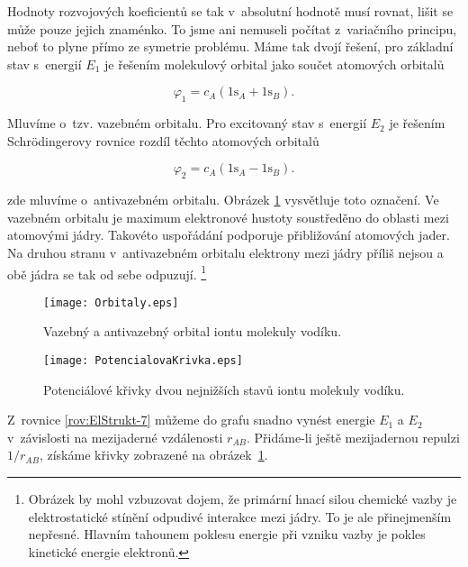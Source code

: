 \noindent Hodnoty rozvojových koeficientů se tak v~absolutní hodnotě musí rovnat, lišit se může pouze jejich znaménko. To jsme ani nemuseli počítat z~variačního principu, neboť to plyne přímo ze symetrie problému. Máme tak dvojí řešení, pro základní stav s~energií $E_1$ je řešením molekulový orbital jako součet atomových orbitalů

\begin{equation}
\varphi_1 = c_A (1\mathrm{s}_A + 1\mathrm{s}_B).
\label{rov:ElStrukt-12}
\end{equation}

\noindent Mluvíme o~tzv. vazebném orbitalu. Pro excitovaný stav s~energií $E_2$ je řešením Schr\"odingerovy rovnice rozdíl těchto atomových orbitalů

\begin{equation}
\varphi_2 = c_A(1\mathrm{s}_A - 1\mathrm{s}_B).
\label{rov:ElStrukt-13}
\end{equation}

\noindent zde mluvíme o~antivazebném orbitalu. Obrázek \ref{obr:Vodik-orbitaly} vysvětluje toto označení. Ve vazebném orbitalu je maximum elektronové hustoty soustředěno do oblasti mezi atomovými jádry. Takovéto uspořádání podporuje přibližování atomových jader. Na druhou stranu v~antivazebném orbitalu elektrony mezi jádry příliš nejsou a obě jádra se tak od sebe odpuzují. \footnote{Obrázek by mohl vzbuzovat dojem, že primární hnací silou chemické vazby je elektrostatické stínění odpudivé interakce mezi jádry. To je ale přinejmenším nepřesné. Hlavním tahounem poklesu energie při vzniku vazby je pokles kinetické energie elektronů.} 

\begin{figure} [htb]
\centering
\texttt{[image: Orbitaly.eps]}
\caption[Orbitaly iontu vodíku]{Vazebný a antivazebný orbital iontu molekuly vodíku.}
\label{obr:Vodik-orbitaly}
\end{figure}

\begin{figure} [htb]
\centering
\texttt{[image: PotencialovaKrivka.eps]}
\caption[Potenciálové křivky iontu vodíku]{Potenciálové křivky dvou nejnižších stavů iontu molekuly vodíku.}
\label{obr:PotencialovaKrivka}
\end{figure}

\noindent Z~rovnice \eqref{rov:ElStrukt-7} můžeme do grafu snadno vynést energie $E_1$ a $E_2$ v~závislosti na mezijaderné vzdálenosti $r_{AB}$. Přidáme-li ještě mezijadernou repulzi $1/r_{AB}$, získáme křivky zobrazené na obrázek~\ref{obr:Vodik-orbitaly}.

